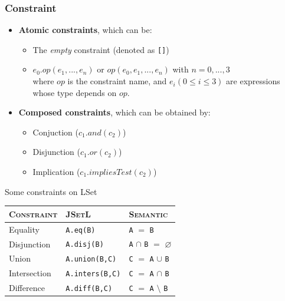 \begin{frame}[fragile]
\frametitle{Constraint}
\begin{itemize}
\setlength\itemsep{2em}
\item \textbf{Atomic constraints}, which can be:\\
\begin{itemize}
\setlength\itemsep{1em}
\item The \emph{empty} constraint (denoted as \texttt{[]})\\
\item $ e_{0}.op(e_{1},...,e_{n}) $ or $op(e_{0},e_{1},...,e_{n}) $ with $ n = 0,...,3 $\\
where $op$ is the constraint name, and $e_{i} (0 \le i \le 3)$ are expressions whose type depends on $op$.\\
\end{itemize}
\item \textbf{Composed constraints}, which can be obtained by:
\begin{itemize}
\setlength\itemsep{1em}
\item Conjuction ($ c_{1}.and(c_{2}) $)
\item Disjunction ($ c_{1}.or(c_{2}) $)
\item Implication ($ c_{1}.impliesTest(c_{2}) $)\\
\end{itemize}
\end{itemize}
\end{frame}

\begin{frame}{Some constraints on LSet}
\begin{table}[]
\begin{tabular}{|l|l|l|}
\hline
\textsc{Constraint}     & \textsc{JSetL}           & \textsc{Semantic}\\ \hline
Equality  	 & \texttt{A.eq(B)}                 & \texttt{A} $=$ \texttt{B}                        \\ \hline
Disjunction  & \texttt{A.disj(B)}           & \texttt{A} $\cap$ \texttt{B} $=$ $\varnothing$   \\ \hline
Union        & \texttt{A.union(B,C)}    & \texttt{C} $=$ \texttt{A} $\cup$ \texttt{B}      \\ \hline
Intersection & \texttt{A.inters(B,C)}  & \texttt{C} $=$ \texttt{A} $\cap$ \texttt{B}      \\ \hline
Difference   & \texttt{A.diff(B,C)}      & \texttt{C} $=$ \texttt{A} $\setminus$ \texttt{B} \\ \hline
\end{tabular}
\end{table}
\end{frame}


